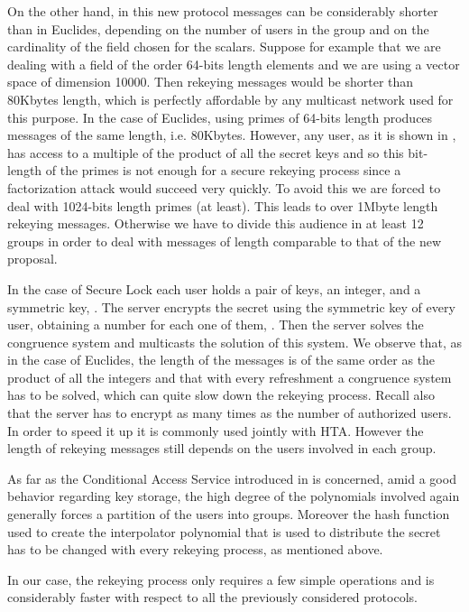 \documentclass[a4paper,11pt]{amsart}
\theoremstyle{definition}
\begin{document}
On the other hand, in this new protocol messages can be considerably
shorter than in Euclides, depending on the number of users in the
group and on the cardinality of the field chosen for the scalars. 
Suppose for example that we are dealing with a field of the order 64-bits
length elements and we are using a vector space of dimension 10000.
Then rekeying messages would be shorter than 80Kbytes length, which is
perfectly affordable by any multicast network used for this purpose.
In the case of Euclides, using primes of 64-bits length produces
messages of the same length, i.e. 80Kbytes.
However, any user, as it is shown in \cite{euclid}, has access to a multiple of
the product of all the secret keys and so this bit-length of the
primes is not enough for a secure rekeying process since a
factorization attack would succeed very quickly. To avoid this we are
forced to deal with 1024-bits length primes (at least).  This leads to
over 1Mbyte length rekeying messages. Otherwise we have to divide this
audience in at least 12 groups in order to deal with messages of
length comparable to that of the new proposal.

\medskip

In the case of Secure Lock each user holds a pair of keys, an integer,  and a symmetric key,
. The server encrypts the secret using the symmetric key  of
every user, obtaining a number for each one of them, . Then the
server solves the congruence system  and multicasts
the solution  of this system.  We observe that, as in the case of
Euclides, the length of the messages is of the same order as the
product of all the integers  and that with every refreshment a
congruence system has to be solved, which can quite slow down the
rekeying process. Recall also that the server has to encrypt as many
times as the number of authorized users. In order to speed it up it is
commonly used jointly with HTA. However the length of rekeying
messages still depends on the users involved in each group.

As far as the Conditional Access Service introduced in \cite{cas} is
concerned, amid a good behavior regarding key storage, the high degree of the polynomials involved again generally forces a
partition of the users into
groups. Moreover the hash function used to create the interpolator polynomial
that is used to distribute the secret has to be changed with every
rekeying process, as mentioned above.

In our case, the rekeying process only requires a few simple
operations and is considerably faster with respect to all the
previously considered protocols. 
\end{document}

